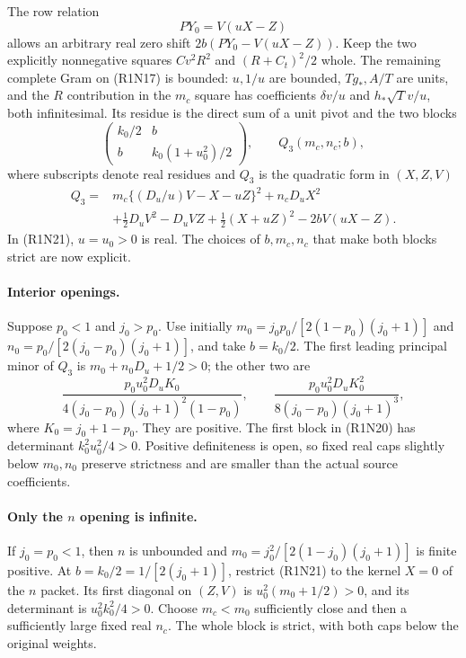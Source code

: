 The row relation
\[
 PY_0=V(uX-Z)                                            \tag{R1N19}
\]
allows an arbitrary real zero shift
$2b(PY_0-V(uX-Z))$.  Keep the two explicitly nonnegative squares
$Cv^2R^2$ and $(R+C_t)^2/2$ whole.  The remaining complete Gram
on (R1N17) is bounded: $u,1/u$ are bounded, $Tg_*,A/T$ are
units, and the $R$ contribution in the $m_c$ square has coefficients
$\delta v/u$ and $h_*\sqrt T v/u$, both infinitesimal.
Its residue is the direct sum of a unit pivot and the two blocks
\[
 \begin{pmatrix}k_0/2&b\\b&k_0(1+u_0^2)/2\end{pmatrix},\qquad
 Q_3(m_c,n_c;b),                                        \tag{R1N20}
\]
where subscripts denote real residues and $Q_3$ is the quadratic
form in $(X,Z,V)$
\begin{align*}
 Q_3={}&m_c\{(D_u/u)V-X-uZ\}^2+n_cD_uX^2\\
       &+\tfrac12D_uV^2-D_uVZ+\tfrac12(X+uZ)^2
                                            -2bV(uX-Z).
\tag{R1N21}
\end{align*}
In (R1N21), $u=u_0>0$ is real.  The choices of $b,m_c,n_c$
that make both blocks strict are now explicit.

\paragraph{Interior openings.}
Suppose $p_0<1$ and $j_0>p_0$.  Use initially
$m_0=j_0p_0/[2(1-p_0)(j_0+1)]$ and
$n_0=p_0/[2(j_0-p_0)(j_0+1)]$, and take $b=k_0/2$.
The first leading principal minor of $Q_3$ is
$m_0+n_0D_u+1/2>0$; the other two are
\[
 \frac{p_0u_0^2D_uK_0}
      {4(j_0-p_0)(j_0+1)^2(1-p_0)},\qquad
 \frac{p_0u_0^2D_uK_0^2}{8(j_0-p_0)(j_0+1)^3},          \tag{R1N22}
\]
where $K_0=j_0+1-p_0$.  They are positive.
The first block in (R1N20) has determinant
$k_0^2u_0^2/4>0$.  Positive definiteness is open, so fixed
real caps slightly below $m_0,n_0$ preserve strictness and are
smaller than the actual source coefficients.

\paragraph{Only the \(n\) opening is infinite.}
If $j_0=p_0<1$, then $n$ is unbounded and
$m_0=j_0^2/[2(1-j_0)(j_0+1)]$ is finite positive.
At $b=k_0/2=1/[2(j_0+1)]$, restrict (R1N21) to the kernel
$X=0$ of the $n$ packet.  Its first diagonal on $(Z,V)$ is
$u_0^2(m_0+1/2)>0$, and its determinant is
$u_0^2k_0^2/4>0$.  Choose $m_c<m_0$ sufficiently close and
then a sufficiently large fixed real $n_c$.  The whole block is
strict, with both caps below the original weights.

